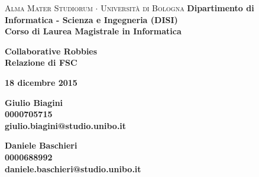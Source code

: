 \begin{list}{}{
  \setlength{\topsep}{20pt}
  \setlength{\leftmargin}{-40pt}%
  \setlength{\rightmargin}{-80pt}%
  \setlength{\listparindent}{0pt}%
  \setlength{\itemindent}{0pt}%
  \setlength{\parsep}{0pt}%
 }%
\item[]
\thispagestyle{empty}

\begin{center}
{{\center \fontsize{17.4}{60}\selectfont \textsc{Alma Mater Studiorum $\cdot$ Università di Bologna}}}
\noindent\makebox[\linewidth]{\rule[0.1cm]{15.8cm}{0.1mm}}
\noindent\makebox[\linewidth]{\rule[0.5cm]{15.8cm}{0.6mm}}
{\small{\bf Dipartimento di Informatica - Scienza e Ingegneria (DISI)\\
Corso di Laurea Magistrale in Informatica}}

\end{center}
\vspace{40mm}
\begin{center}
{\LARGE{\bf Collaborative Robbies}}\\
\vspace{3mm} {\large{\bf Relazione di FSC}}
\end{center}
\vspace{20mm}
\begin{center}
{\large{\bf 18 dicembre 2015}}
\end{center}
\vspace{50mm}
\par
\noindent
\begin{minipage}[t]{0.54\textwidth}\raggedright
{\large{\bf Giulio Biagini\\
0000705715\\
giulio.biagini@studio.unibo.it\vspace{\baselineskip}}}\\
\end{minipage}
\hfill
\begin{minipage}[t]{0.54\textwidth}\raggedleft
{\large{\bf Daniele Baschieri\\
0000688992\\
daniele.baschieri@studio.unibo.it}}
\end{minipage}

\end{list}

